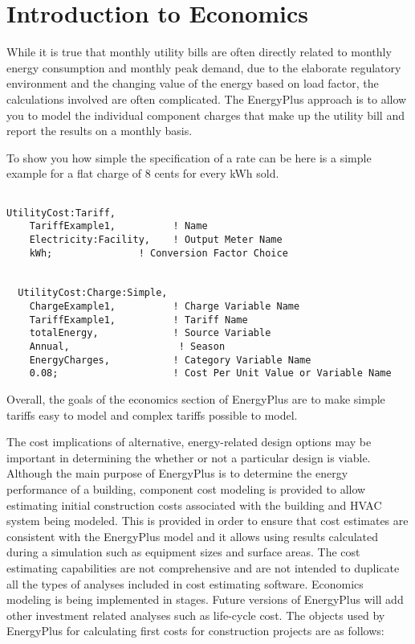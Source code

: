 \section{Introduction to Economics}\label{introduction-to-economics}

While it is true that monthly utility bills are often directly related to monthly energy consumption and monthly peak demand, due to the elaborate regulatory environment and the changing value of the energy based on load factor, the calculations involved are often complicated. The EnergyPlus approach is to allow you to model the individual component charges that make up the utility bill and report the results on a monthly basis.

To show you how simple the specification of a rate can be here is a simple example for a flat charge of 8 cents for every kWh sold.

\begin{lstlisting}

UtilityCost:Tariff,
    TariffExample1,          ! Name
    Electricity:Facility,    ! Output Meter Name
    kWh;               ! Conversion Factor Choice


  UtilityCost:Charge:Simple,
    ChargeExample1,          ! Charge Variable Name
    TariffExample1,          ! Tariff Name
    totalEnergy,             ! Source Variable
    Annual,                   ! Season
    EnergyCharges,           ! Category Variable Name
    0.08;                    ! Cost Per Unit Value or Variable Name
\end{lstlisting}

Overall, the goals of the economics section of EnergyPlus are to make simple tariffs easy to model and complex tariffs possible to model.

The cost implications of alternative, energy-related design options may be important in determining the whether or not a particular design is viable. Although the main purpose of EnergyPlus is to determine the energy performance of a building, component cost modeling is provided to allow estimating initial construction costs associated with the building and HVAC system being modeled. This is provided in order to ensure that cost estimates are consistent with the EnergyPlus model and it allows using results calculated during a simulation such as equipment sizes and surface areas. The cost estimating capabilities are not comprehensive and are not intended to duplicate all the types of analyses included in cost estimating software. Economics modeling is being implemented in stages. Future versions of EnergyPlus will add other investment related analyses such as life-cycle cost. The objects used by EnergyPlus for calculating first costs for construction projects are as follows:

